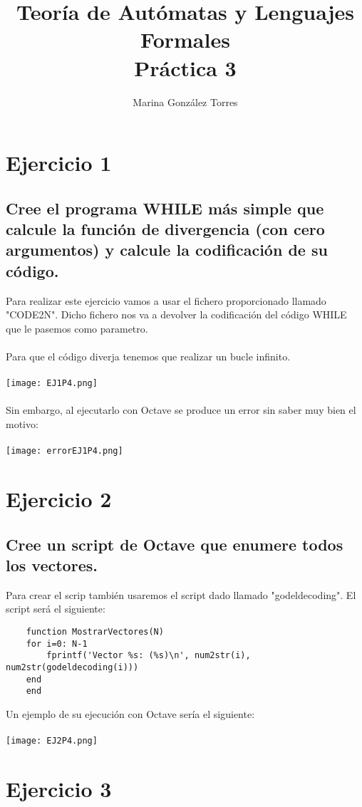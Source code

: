 \documentclass{article}
\title{Teoría de Autómatas y Lenguajes Formales\\[.4\baselineskip]Práctica 3}
\author{Marina González Torres}
\date{}
\begin{document}
\maketitle

\section*{Ejercicio 1}
\subsection*{Cree el programa WHILE más simple que calcule la función de divergencia (con cero argumentos) y calcule la codificación de su código.}
Para realizar este ejercicio vamos a usar el fichero proporcionado llamado "CODE2N". Dicho fichero nos va a devolver la codificación del código WHILE que le pasemos como parametro.
\\
\\ Para que el código diverja tenemos que realizar un bucle infinito.
\\
\\ \texttt{[image: EJ1P4.png]}
\\
\\ Sin embargo, al ejecutarlo con Octave se produce un error sin saber muy bien el motivo:
\\
\\ \texttt{[image: errorEJ1P4.png]}

\newpage
\section*{Ejercicio 2}
\subsection*{Cree un script de Octave que enumere todos los vectores.}
Para crear el scrip también usaremos el script dado llamado "godeldecoding". El script será el siguiente:
\begin{verbatim}
    function MostrarVectores(N)
    for i=0: N-1
        fprintf('Vector %s: (%s)\n', num2str(i), num2str(godeldecoding(i)))
    end
    end
\end{verbatim}
Un ejemplo de su ejecución con Octave sería el siguiente:
\\
\\ \texttt{[image: EJ2P4.png]}

\section*{Ejercicio 3}
\end{document}
